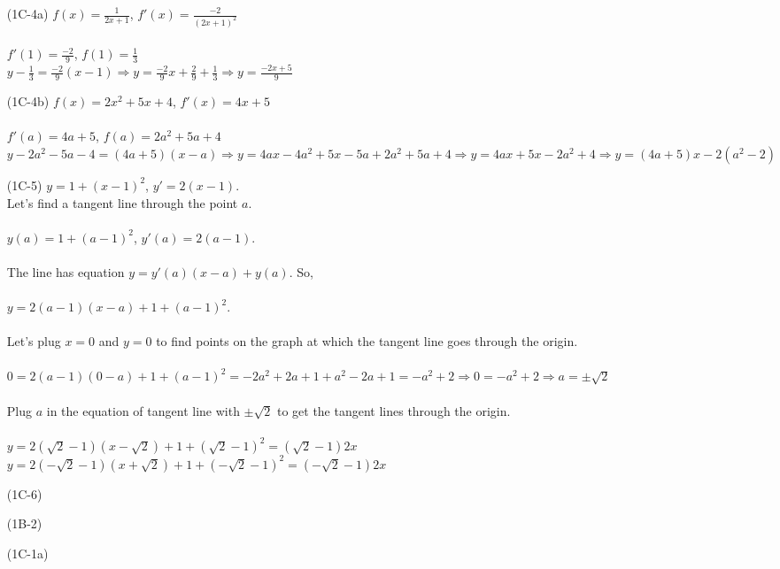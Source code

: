 \documentclass{article}
\begin{document}
\begin{itemize}
\item[(1C-4a)] $f(x) = \frac{1}{2x+1}$, $f'(x) = \frac{-2}{(2x+1)^2}$ \\ \\ 
$f'(1) = \frac{-2}{9}$, $f(1) = \frac{1}{3}$ \\

$y - \frac{1}{3} = \frac{-2}{9}(x-1) \Rightarrow 
y = \frac{-2}{9}x + \frac{2}{9} + \frac{1}{3} \Rightarrow
y = \frac{-2x+5}{9}$

\item[(1C-4b)]
$f(x) = 2x^2+5x+4$, $f'(x) = 4x+5$ \\ \\ 
$f'(a) = 4a+5$, $f(a) = 2a^2+5a+4$ \\

$y - 2a^2-5a-4 = (4a+5)(x-a) \Rightarrow 
y = 4ax-4a^2+5x-5a+2a^2+5a+4 \Rightarrow
y = 4ax+5x-2a^2+4 \Rightarrow y = (4a+5)x-2(a^2-2)$
\item[(1C-5)]
$y = 1 + (x - 1)^2$, $y' = 2(x-1)$. \\
Let's find a tangent line through the point $a$. \\ \\
$y(a) = 1 + (a - 1)^2$, $y'(a) = 2(a - 1)$. \\ \\
The line has equation $y = y'(a)(x-a) + y(a)$. So,\\ \\
$y = 2(a-1)(x-a)+1+(a-1)^2$. \\ \\
Let's plug $x = 0$ and $y = 0$ to find points on the graph at which the tangent line goes through the origin.\\ \\
$0 = 2(a-1)(0-a)+1+(a-1)^2 = -2a^2+2a+1+a^2-2a+1 = -a^2+2 \Rightarrow 0 =-a^2+2 \Rightarrow a = \pm \sqrt{2}$
\\ \\
Plug $a$ in the equation of tangent line with $\pm \sqrt{2}$ to get the tangent lines through the origin. \\ \\
$y = 2(\sqrt{2}-1)(x-\sqrt{2})+1+(\sqrt{2}-1)^2 = (\sqrt{2}-1)2x$ \\

$y = 2(-\sqrt{2}-1)(x+\sqrt{2})+1+(-\sqrt{2}-1)^2 = (-\sqrt{2}-1)2x$

\item[(1C-6)]
\item[(1B-2)]
\item[(1C-1a)]
\end{itemize}
\end{document}
